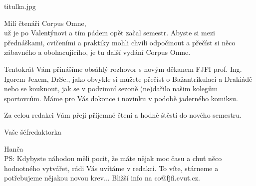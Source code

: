\documentclass{CorpusOmne}
\begin{document}
\begin{COtitlepage}[70]{titulka.jpg}
\vfill
{}
\end{COtitlepage}


\COeditorial
\begin{COcolumn}[2]
Milí čtenáři Corpus Omne,\\[4mm]
už je po Valentýnovi a tím pádem opět začal semestr. Abyste si mezi přednáškami, cvičeními a praktiky mohli chvíli odpočinout a přečíst si něco zábavného a obohacujícího, je tu další vydání Corpus Omne.

Tentokrát Vám přinášíme obsáhlý rozhovor s novým děkanem FJFI prof. Ing. Igorem Jexem, DrSc., jako obvykle si můžete přečíst o Bažantrikulaci a Drakiádě nebo se kouknout, jak se v podzimní sezoně (ne)dařilo našim kolegům sportovcům. Máme pro Vás dokonce i novinku v podobě jaderného komiksu.

Za celou redakci Vám přeji příjemné čtení a hodně štěstí do nového semestru.

\hfill Vaše šéfredaktorka

\hfill Hanča
\\[4mm]
PS: Kdybyste náhodou měli pocit, že máte nějak moc času a chuť něco hodnotného vytvářet, rádi Vás uvítáme v redakci. To víte, stárneme a potřebujeme nějakou novou krev... Bližší info na co@fjfi.cvut.cz.
\end{COcolumn}

\COtableofcontents
\pagebreak


\begin{COcolumn}
\lipsum
{}
\end{COcolumn}

\begin{COcolumn}[2]
\lipsum[4]
\lipsum[5]
\lipsum
\lipsum
{}
\end{COcolumn}

\end{document}
